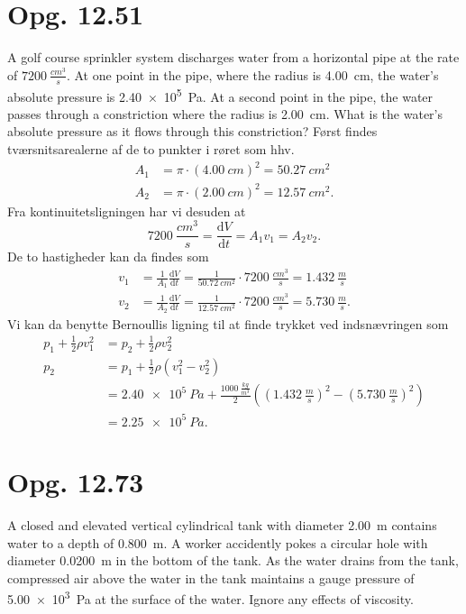 \documentclass[12pt]{article}
\theoremstyle{definition}
\begin{document}
\section*{Opg. 12.51}
A golf course sprinkler system discharges water from a horizontal pipe at the rate of $\qty{7200}{\frac{cm^3}{s}}$. At one point in the pipe, where the radius is \qty{4,00}{cm}, the water’s absolute pressure is \qty{2,40e5}{Pa}. At a second point in the pipe, the water passes through a constriction where the radius is \qty{2,00}{cm}. What is the water’s absolute pressure as it flows through this constriction?
\bigbreak
Først findes tværsnitsarealerne af de to punkter i røret som hhv.
\begin{align*}
  A_1 &= \pi \cdot (\qty{4,00}{cm})^2 = \qty{50,27}{cm^2} \\
  A_2 &= \pi \cdot (\qty{2,00}{cm})^2 = \qty{12,57}{cm^2} 
.\end{align*}
Fra kontinuitetsligningen har vi desuden at
\[ 
  \qty{7200}{\frac{cm^3}{s}} = \frac{\mathrm{d}V}{\mathrm{d}t} = A_1v_1 = A_2v_2 
.\]
De to hastigheder kan da findes som
\begin{align*}
  v_1 &= \frac{1}{A_1} \frac{\mathrm{d}V}{\mathrm{d}t} = \frac{1}{\qty{50,72}{cm^2}} \cdot \qty{7200}{\frac{cm^3}{s}} = \qty{1,432}{\frac{m}{s}} \\
  v_2 &= \frac{1}{A_2} \frac{\mathrm{d}V}{\mathrm{d}t} = \frac{1}{\qty{12,57}{cm^2}} \cdot \qty{7200}{\frac{cm^3}{s}} = \qty{5,730}{\frac{m}{s}} 
.\end{align*}
Vi kan da benytte Bernoullis ligning til at finde trykket ved indsnævringen som
\begin{align*}
  p_1 + \frac{1}{2} \rho v_1^2 &= p_2 + \frac{1}{2} \rho v_2^2  \\
  p_2           &= p_1 + \frac{1}{2}\rho \left( v_1^2 - v_2^2 \right) \\
               &= \qty{2,40e5}{Pa} + \frac{\qty{1000}{\frac{kg}{m^3}}}{2} \left( \left( \qty{1,432}{\frac{m}{s}} \right)^2 - \left( \qty{5,730}{\frac{m}{s}}  \right)^2  \right) \\
               &= \qty{2,25e5}{Pa} 
.\end{align*}



\section*{Opg. 12.73}
A closed and elevated vertical cylindrical tank with diameter \qty{2,00}{m} contains water to a depth of \qty{0,800}{m}. A worker accidently pokes a circular hole with diameter \qty{0,0200}{m} in the bottom of the tank. As the water drains from the tank, compressed air above the water in the tank maintains a gauge pressure of \qty{5,00e3}{Pa} at the surface of the water. Ignore any effects of viscosity.
\end{document}
